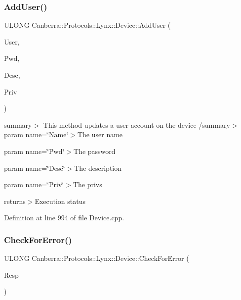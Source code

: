 \subsubsection{\texorpdfstring{Add\+User()}{AddUser()}}
{\footnotesize\ttfamily U\+L\+O\+NG Canberra\+::\+Protocols\+::\+Lynx\+::\+Device\+::\+Add\+User (\begin{DoxyParamCaption}\item[{const \hyperlink{class_canberra_1_1_utility_1_1_core_1_1_string}{Canberra\+::\+Utility\+::\+Core\+::\+String} \&}]{User,  }\item[{const \hyperlink{class_canberra_1_1_utility_1_1_core_1_1_string}{Canberra\+::\+Utility\+::\+Core\+::\+String} \&}]{Pwd,  }\item[{const \hyperlink{class_canberra_1_1_utility_1_1_core_1_1_string}{Canberra\+::\+Utility\+::\+Core\+::\+String} \&}]{Desc,  }\item[{L\+O\+NG}]{Priv }\end{DoxyParamCaption})}

summary$>$ This method updates a user account on the device /summary$>$ param name=\char`\"{}\+Name\char`\"{}$>$The user name 

param name=\char`\"{}\+Pwd\char`\"{}$>$The password 

param name=\char`\"{}\+Desc\char`\"{}$>$The description 

param name=\char`\"{}\+Priv\char`\"{}$>$The privs 

returns$>$Execution status

Definition at line 994 of file Device.\+cpp.

\mbox{\label{class_canberra_1_1_protocols_1_1_lynx_1_1_device_a34ad6cf7b51838a546cb0feef503cc7b_a34ad6cf7b51838a546cb0feef503cc7b}} 
\subsubsection{\texorpdfstring{Check\+For\+Error()}{CheckForError()}}
{\footnotesize\ttfamily U\+L\+O\+NG Canberra\+::\+Protocols\+::\+Lynx\+::\+Device\+::\+Check\+For\+Error (\begin{DoxyParamCaption}\item[{\hyperlink{class_canberra_1_1_data_types_1_1_application_1_1_command_data}{Canberra\+::\+Data\+Types\+::\+Application\+::\+Command\+Data} $\ast$}]{Resp }\end{DoxyParamCaption})\hspace{0.3cm}{\ttfamily [protected]}}

